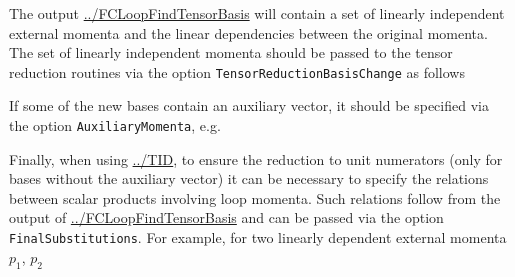 \documentclass[../FeynCalcManual.tex]{subfiles}
\begin{document}
The output
\hyperlink{../fcloopfindtensorbasis}{../FCLoopFindTensorBasis} will
contain a set of linearly independent external momenta and the linear
dependencies between the original momenta. The set of linearly
independent momenta should be passed to the tensor reduction routines
via the option \texttt{TensorReductionBasisChange} as follows

\begin{Shaded}
\begin{Highlighting}[]
\OtherTok{{-}\textgreater{}} \OperatorTok{\{}\OtherTok{{-}\textgreater{}}\OperatorTok{,}\OtherTok{{-}\textgreater{}}\OperatorTok{,}\OperatorTok{\}}
\end{Highlighting}
\end{Shaded}

If some of the new bases contain an auxiliary vector, it should be
specified via the option \texttt{AuxiliaryMomenta}, e.g.

\begin{Shaded}
\begin{Highlighting}[]
\OtherTok{{-}\textgreater{}} \OperatorTok{\{}\OperatorTok{\}}
\end{Highlighting}
\end{Shaded}

Finally, when using \hyperlink{../tid}{../TID}, to ensure the reduction
to unit numerators (only for bases without the auxiliary vector) it can
be necessary to specify the relations between scalar products involving
loop momenta. Such relations follow from the output of
\hyperlink{../fcloopfindtensorbasis}{../FCLoopFindTensorBasis} and can
be passed via the option \texttt{FinalSubstitutions}. For example, for
two linearly dependent external momenta \(p_1\), \(p_2\)

\begin{Shaded}
\begin{Highlighting}[]
\OperatorTok{[\{}\OperatorTok{,}\OperatorTok{\},} \OperatorTok{\{}\OperatorTok{[}\OperatorTok{]} \OtherTok{{-}\textgreater{}} \OperatorTok{,}\OperatorTok{[}\OperatorTok{]} \OtherTok{{-}\textgreater{}} \OperatorTok{,}\OperatorTok{[}\OperatorTok{,}\OperatorTok{]} \OtherTok{{-}\textgreater{}} \OperatorTok{\},} \OperatorTok{]}
\end{Highlighting}
\end{Shaded}
\end{document}
